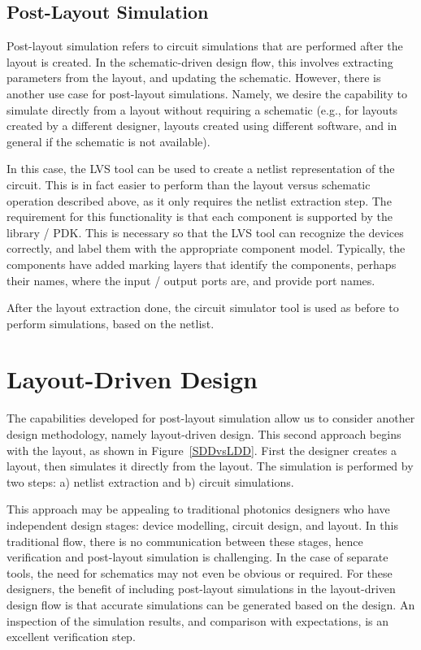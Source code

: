 \documentclass[journal]{spie}
\begin{document}
\subsection{Post-Layout Simulation}

Post-layout simulation refers to circuit simulations that are performed after the layout is created.  In the schematic-driven design flow, this involves extracting parameters from the layout, and updating the schematic.  However, there is another use case for post-layout simulations.  Namely, we desire the capability to simulate directly from a layout without requiring a schematic (e.g., for layouts created by a different designer,  layouts created using different software, and in general if the schematic is not available).

In this case, the LVS tool can be used to create a netlist representation of the circuit.  This is in fact easier to perform than the layout versus schematic operation described above, as it only requires the netlist extraction step.  The requirement for this functionality is that each component is supported by the library / PDK.  This is necessary so that the LVS tool can recognize the devices correctly, and label them with the appropriate component model.  Typically, the components have added marking layers that identify the components, perhaps their names, where the input / output ports are, and provide port names.

After the layout extraction done, the circuit simulator tool is used as before to perform simulations, based on the netlist.

\section{Layout-Driven Design}

The capabilities developed for post-layout simulation allow us to consider another design methodology, namely layout-driven design.   This second approach begins with the layout, as shown in Figure~\ref{SDDvsLDD}.  First the designer creates a layout, then simulates it directly from the layout.  The simulation is performed by two steps: a) netlist extraction and b) circuit simulations.  

This approach may be appealing to traditional photonics designers who have independent design stages: device modelling, circuit design, and layout.  In this traditional flow, there is no communication between these stages, hence verification and post-layout simulation is challenging.  In the case of separate tools, the need for schematics may not even be obvious or required.  For these designers, the benefit of including post-layout simulations in the layout-driven design flow is that accurate simulations can be generated based on the design.  An inspection of the simulation results, and comparison with expectations, is an excellent verification step.
\end{document}

